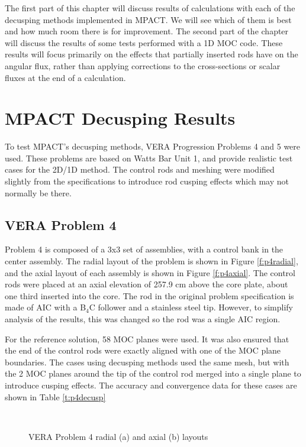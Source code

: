The first part of this chapter will discuss results of calculations with each of the decusping methods implemented in MPACT.  We will see which of them is best and how much room there is for improvement.  The second part of the chapter will discuss the results of some tests performed with a 1D MOC code.  These results will focus primarily on the effects that partially inserted rods have on the angular flux, rather than applying corrections to the cross-sections or scalar fluxes at the end of a calculation.

\section{MPACT Decusping Results}

To test MPACT's decusping methods, VERA Progression Problems 4 and 5 \cite{VERAProgressionProblems} were used.  These problems are based on Watts Bar Unit 1, and provide realistic test cases for the 2D/1D method.  The control rods and meshing were modified slightly from the specifications to introduce rod cusping effects which may not normally be there.

\subsection{VERA Problem 4}

Problem 4 is composed of a 3x3 set of assemblies, with a control bank in the center assembly.  The radial layout of the problem is shown in Figure \ref{f:p4radial}, and the axial layout of each assembly is shown in Figure \ref{f:p4axial}.  The control rods were placed at an axial elevation of 257.9 cm above the core plate, about one third inserted into the core.  The rod in the original problem specification is made of AIC with a B$_4$C follower and a stainless steel tip.  However, to simplify analysis of the results, this was changed so the rod was a single AIC region.

For the reference solution, 58 MOC planes were used.  It was also ensured that the end of the control rods were exactly aligned with one of the MOC plane boundaries.  The cases using decusping methods used the same mesh, but with the 2 MOC planes around the tip of the control rod merged into a single plane to introduce cusping effects.  The accuracy and convergence data for these cases are shown in Table \ref{t:p4decusp}

\begin{figure}[h]\label{f:p4layout}
\centering
{}
~
\caption{VERA Problem 4 radial (a) and axial (b) layouts}\label{f:p4}
\end{figure}

